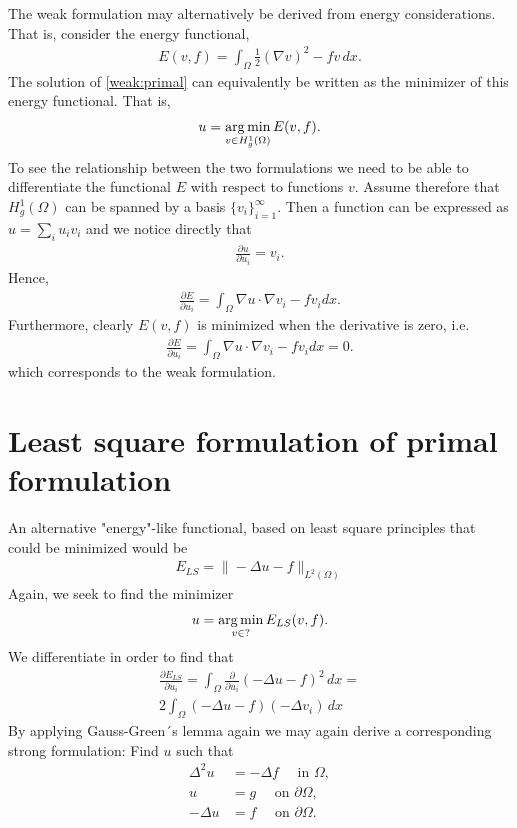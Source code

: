 The weak formulation may alternatively be derived from energy considerations. That is, 
consider the energy functional, 
\begin{align}
E (v, f) = \int_\Omega \frac{1}{2} (\nabla v)^2  - f v \, dx.   
\end{align}
The solution of \eqref{weak:primal} can equivalently be written as the minimizer of this energy functional. That is, 
\begin{align}
u = \operatorname*{arg\,min}_{v \in H^1_g(\Omega) } E (v, f) .   
\end{align}
To see the relationship between the two formulations we need to be able to differentiate the functional $E$ with respect 
to functions $v$. Assume therefore that $H^1_g(\Omega)$ can be spanned by a basis $\{v_i\}^\infty_{i=1}$. Then 
a function can be expressed as $u=\sum_i u_i v_i$ and we notice directly that
\begin{align} 
\frac{\partial u }{\partial u_i } = v_i .  
\end{align} 
Hence, 
\begin{align} 
\frac{\partial E }{\partial u_i } = \int_\Omega \nabla u \cdot \nabla v_i - f v_i dx  .  
\end{align} 
Furthermore, clearly $E(v, f)$ is minimized when the derivative is zero, i.e. 
\begin{align} 
\frac{\partial E }{\partial u_i } = \int_\Omega \nabla u \cdot \nabla v_i - f v_i dx = 0  .  
\end{align} 
which corresponds to the weak formulation. 

\section{Least square formulation of primal formulation}

An alternative "energy"-like functional, based on least square principles that could be minimized would  
be  
\begin{align}
E_{LS} = \|-\Delta u - f\|_{L^2(\Omega)}
\end{align}
Again, we seek to find the minimizer
\begin{align}
u = \operatorname*{arg\,min}_{v \in ? } E_{LS} (v, f) .   
\end{align}
We differentiate in order to find that 
\begin{align} 
\label{weak:primal:ls}
\frac{\partial E_{LS}}{\partial u_i} = \int_\Omega \frac{\partial}{\partial u_i} (-\Delta u - f)^2 \, dx  = \\  
2 \int_\Omega (-\Delta u - f) (-\Delta v_i) \, dx 
\end{align} 
By applying Gauss-Green´s lemma again we may again derive a corresponding strong formulation:
Find $u$ such that     
\begin{align}
\label{strong:primal:ls}
\Delta^2 u &= -\Delta f \quad \mbox{ in } \Omega, \\ 
 u &= g \quad \mbox{ on } \partial \Omega,   \\ 
 -\Delta u &= f \quad \mbox{ on } \partial \Omega .  
\end{align}

